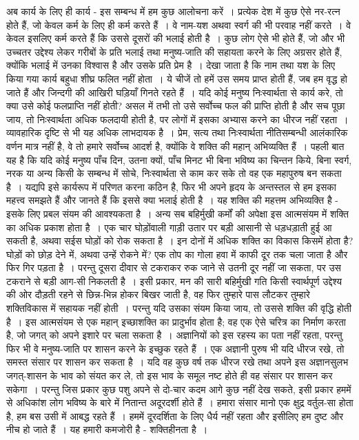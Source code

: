 अब कार्य के लिए ही कार्य - इस सम्बन्ध में हम कुछ आलोचना करें~। प्रत्येक देश में कुछ ऐसे नर-रत्न होते हैं, जो केवल कर्म के लिए ही कर्म करते हैं~। वे नाम-यश अथवा स्वर्ग की भी परवाह नहीं करते~। वे केवल इसलिए कर्म करते हैं कि उससे दूसरों की भलाई होती है~। कुछ लोग ऐसे भी होते हैं, जो और भी उच्चतर उद्देश्य लेकर गरीबों के प्रति भलाई तथा मनुष्य-जाति की सहायता करने के लिए अग्रसर होते हैं, क्योंकि भलाई में उनका विश्वास है और उसके प्रति प्रेम है~। देखा जाता है कि नाम तथा यश के लिए किया गया कार्य बहुधा शीघ्र फलित नहीं होता~। ये चीजें तो हमें उस समय प्राप्त होती हैं, जब हम वृद्ध हो जाते हैं और जिन्दगी की आखिरी घड़ियाँ गिनते रहते हैं~। यदि कोई मनुष्य निःस्वार्थता से कार्य करे, तो क्या उसे कोई फलप्राप्ति नहीं होती? असल में तभी तो उसे सर्वोच्च फल की प्राप्ति होती है और सच पूछा जाय, तो निःस्वार्थता अधिक फलदायी होती है, पर लोगों में इसका अभ्यास करने का धीरज नहीं रहता~। व्यावहारिक दृष्टि से भी यह अधिक लाभदायक है~। प्रेम, सत्य तथा निःस्वार्थता नीतिसम्बन्धी आलंकारिक वर्णन मात्र नहीं है, वे तो हमारे सर्वोच्च आदर्श है, क्योंकि वे शक्ति की महान् अभिव्यक्ति हैं~। पहली बात यह है कि यदि कोई मनुष्य पाँच दिन, उतना क्यों, पाँच मिनट भी बिना भविष्य का चिन्तन किये, बिना स्वर्ग, नरक या अन्य किसी के सम्बन्ध में सोचे, निःस्वार्थता से काम कर सके तो वह एक महापुरुष बन सकता है~। यद्यपि इसे कार्यरूप में परिणत करना कठिन है, फिर भी अपने हृदय के अन्तस्तल से हम इसका महत्त्व समझते हैं और जानते हैं कि इससे क्या भलाई होती है~। यह शक्ति की महत्तम अभिव्यक्ति है - इसके लिए प्रबल संयम की आवश्यकता है~। अन्य सब बहिर्मुखी कर्मों की अपेक्षा इस आत्मसंयम में शक्ति का अधिक प्रकाश होता है~। एक चार घोड़ोंवाली गाड़ी उतार पर बड़ी आसानी से धड़धड़ाती हुई आ सकती है, अथवा सईस घोड़ों को रोक सकता है~। इन दोनों में अधिक शक्ति का विकास किसमें होता है? घोड़ों को छोड़ देने में, अथवा उन्हें रोकने में? एक तोप का गोला हवा में काफी दूर तक चला जाता है और फिर गिर पड़ता है~। परन्तु दूसरा दीवार से टकराकर रुक जाने से उतनी दूर नहीं जा सकता, पर उस टकराने से बड़ी आग-सी निकलती है~। इसी प्रकार, मन की सारी बहिर्मुखी गति किसी स्वार्थपूर्ण उद्देश्य की ओर दौड़ती रहने से छिन्न-भिन्न होकर बिखर जाती है, वह फिर तुम्हारे पास लौटकर तुम्हारे शक्तिविकास में सहायक नहीं होती~। परन्तु यदि उसका संयम किया जाय, तो उससे शक्ति की वृद्धि होती है~। इस आत्मसंयम से एक महान् इच्छाशक्ति का प्रादुर्भाव होता है; वह एक ऐसे चरित्र का निर्माण करता है, जो जगत् को अपने इशारे पर चला सकता है~। अज्ञानियों को इस रहस्य का पता नहीं रहता, परन्तु फिर भी वे मनुष्य-जाति पर शासन करने के इच्छुक रहते हैं~। एक अज्ञानी पुरुष भी यदि धीरज रखे, तो समस्त संसार पर शासन कर सकता है~। यदि वह कुछ वर्ष तक धीरज रखे तथा अपने इस अज्ञानसुलभ जगत्-शासन के भाव को संयत कर ले, तो इस भाव के समूल नष्ट होते ही वह संसार पर शासन कर सकेगा~। परन्तु जिस प्रकार कुछ पशु अपने से दो-चार कदम आगे कुछ नहीं देख सकते, इसी प्रकार हममें से अधिकांश लोग भविष्य के बारे में नितान्त अदूरदर्शी होते हैं~। हमारा संसार मानो एक क्षुद्र वर्तुल-सा होता है, हम बस उसी में आबद्ध रहते हैं~। हममें दूरदर्शिता के लिए धैर्य नहीं रहता और इसीलिए हम दुष्ट और नीच हो जाते हैं~। यह हमारी कमजोरी है - शक्तिहीनता है~।

